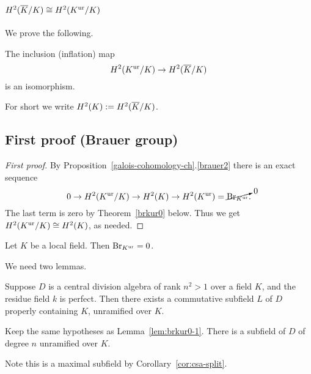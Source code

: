 \section{$H^2(\overline{K}/K)\cong H^2(K^{\text{ur}}/K)$}
We prove the following.
\begin{thm}
The inclusion (inflation) map
\[
H^2(K^{\text{ur}}/K)\to H^2(\overline{K}/K)
\]
is an isomorphism.
\end{thm}
For short we write $H^2(K):=H^2(\overline{K}/K)$.
\subsection{First proof (Brauer group)}
\begin{proof}[First proof]
By Proposition~\ref{galois-cohomology-ch}.\ref{brauer2} there is an exact sequence
\[
0\to H^2(K^{\text{ur}}/K)\to H^2(K)\to H^2(K^{\text{ur}})= \cancelto{0}{\operatorname{Br}_{K^{\text{ur}}}}.
\]
The last term is zero by Theorem~\ref{brkur0} below. %
Thus we get $H^2(K^{\text{ur}}/K)\cong H^2(K)$, as needed.
\end{proof}
\begin{thm}
Let $K$ be a local field. Then $\operatorname{Br}_{K^{\text{ur}}}=0$. 
\end{thm}
We need two lemmas.
\begin{lem}
Suppose $D$ is a central division algebra of rank $n^2>1$ over a field $K$, and the residue field $k$ is perfect. Then there exists a  commutative subfield $L$ of $D$ properly containing $K$, unramified over $K$.
\end{lem}
\begin{lem}
Keep the same hypotheses as Lemma~\ref{lem:brkur0-1}. There is a subfield of $D$ of degree $n$ unramified over $K$.
\end{lem}
Note this is a maximal subfield by Corollary~\ref{cor:csa-split}.
